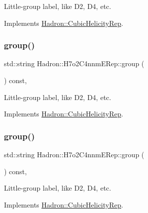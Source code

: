 Little-\/group label, like D2, D4, etc. 

Implements \mbox{\hyperlink{structHadron_1_1CubicHelicityRep_a101a7d76cd8ccdad0f272db44b766113}{Hadron\+::\+Cubic\+Helicity\+Rep}}.

\mbox{\label{structHadron_1_1H7o2C4nnmERep_ac3302d0096df1ab32253be3f3e289b83}} 
\subsubsection{\texorpdfstring{group()}{group()}\hspace{0.1cm}{\footnotesize\ttfamily [2/3]}}
{\footnotesize\ttfamily std\+::string Hadron\+::\+H7o2\+C4nnm\+E\+Rep\+::group (\begin{DoxyParamCaption}{ }\end{DoxyParamCaption}) const\hspace{0.3cm}{\ttfamily [inline]}, {\ttfamily [virtual]}}

Little-\/group label, like D2, D4, etc. 

Implements \mbox{\hyperlink{structHadron_1_1CubicHelicityRep_a101a7d76cd8ccdad0f272db44b766113}{Hadron\+::\+Cubic\+Helicity\+Rep}}.

\mbox{\label{structHadron_1_1H7o2C4nnmERep_ac3302d0096df1ab32253be3f3e289b83}} 
\subsubsection{\texorpdfstring{group()}{group()}\hspace{0.1cm}{\footnotesize\ttfamily [3/3]}}
{\footnotesize\ttfamily std\+::string Hadron\+::\+H7o2\+C4nnm\+E\+Rep\+::group (\begin{DoxyParamCaption}{ }\end{DoxyParamCaption}) const\hspace{0.3cm}{\ttfamily [inline]}, {\ttfamily [virtual]}}

Little-\/group label, like D2, D4, etc. 

Implements \mbox{\hyperlink{structHadron_1_1CubicHelicityRep_a101a7d76cd8ccdad0f272db44b766113}{Hadron\+::\+Cubic\+Helicity\+Rep}}.

